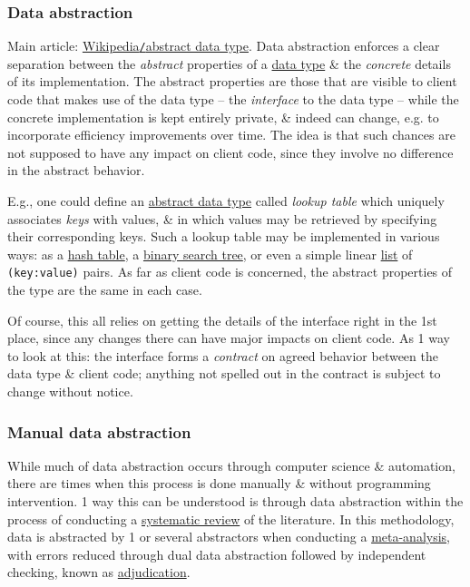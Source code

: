 \documentclass{article}
\begin{document}
\subsubsection{Data abstraction}
Main article: \href{https://en.wikipedia.org/wiki/Abstract_data_type}{Wikipedia{\tt/}abstract data type}. Data abstraction enforces a clear separation between the {\it abstract} properties of a \href{https://en.wikipedia.org/wiki/Data_type}{data type} \& the {\it concrete} details of its implementation. The abstract properties are those that are visible to client code that makes use of the data type -- the {\it interface} to the data type -- while the concrete implementation is kept entirely private, \& indeed can change, e.g. to incorporate efficiency improvements over time. The idea is that such chances are not supposed to have any impact on client code, since they involve no difference in the abstract behavior.

E.g., one could define an \href{https://en.wikipedia.org/wiki/Abstract_data_type}{abstract data type} called {\it lookup table} which uniquely associates {\it keys} with values, \& in which values may be retrieved by specifying their corresponding keys. Such a lookup table may be implemented in various ways: as a \href{https://en.wikipedia.org/wiki/Hash_table}{hash table}, a \href{https://en.wikipedia.org/wiki/Binary_search_tree}{binary search tree}, or even a simple linear \href{https://en.wikipedia.org/wiki/List_(computing)}{list} of {\tt(key:value)} pairs. As far as client code is concerned, the abstract properties of the type are the same in each case.

Of course, this all relies on getting the details of the interface right in the 1st place, since any changes there can have major impacts on client code. As 1 way to look at this: the interface forms a {\it contract} on agreed behavior between the data type \& client code; anything not spelled out in the contract is subject to change without notice.

\subsubsection{Manual data abstraction}
While much of data abstraction occurs through computer science \& automation, there are times when this process is done manually \& without programming intervention. 1 way this can be understood is through data abstraction within the process of conducting a \href{https://en.wikipedia.org/wiki/Systematic_review}{systematic review} of the literature. In this methodology, data is abstracted by 1 or several abstractors when conducting a \href{https://en.wikipedia.org/wiki/Meta-analysis}{meta-analysis}, with errors reduced through dual data abstraction followed by independent checking, known as \href{https://en.wikipedia.org/wiki/Adjudication}{adjudication}.
\end{document}
